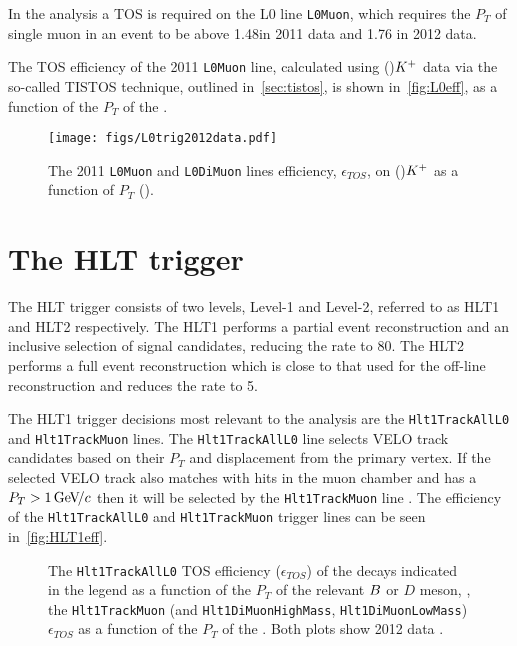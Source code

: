
In the \Lbpi analysis a TOS is required on the L0 line \texttt{L0Muon}, which requires the $P_{T}$  of single muon in an event to be above 1.48\gevc in 2011 data \cite{2011trig} and 1.76 \gevc in 2012 data.

The TOS efficiency of the 2011 \texttt{L0Muon} line, calculated using \Bu\to\jpsi(\mup\mun)${K}^{+}$ data via the so-called TISTOS technique, outlined in~\autoref{sec:tistos}, is shown in~\autoref{fig:L0eff}, as a function of the $P_{T}$ of the \jpsi.
\begin{figure}
  \centering
  \texttt{[image: figs/L0trig2012data.pdf]}%
  \caption{The 2011 \texttt{L0Muon} and \texttt{L0DiMuon} lines efficiency, $\epsilon_{TOS}$, on \Bu\to\jpsi(\mup\mun)${K}^{+}$ as a function of $P_{T}$ (\jpsi)\cite{LHCbperf}.
  }
  \label{fig:L0eff}
\end{figure}




\section{The HLT trigger}
\label{sec:hlttrig}
The HLT trigger consists of two levels, Level-1 and Level-2, referred to as HLT1 and HLT2 respectively. The HLT1 performs a partial event reconstruction and an inclusive selection of signal candidates, reducing the rate to 80\khz. The HLT2 performs a full event reconstruction which is close to that used for the off-line reconstruction and reduces the rate to 5\khz.

The HLT1 trigger decisions most relevant to the \Lbpi analysis are the \texttt{Hlt1TrackAllL0} and \texttt{Hlt1TrackMuon} lines. The \texttt{Hlt1TrackAllL0} line selects VELO track candidates based on their $P_{T}$ and displacement from the primary vertex. If the selected VELO track also matches with hits in the muon chamber and has a $P_{T}>1{\mathrm{\,Ge\kern -0.1em V\!/}c}$ then it will be selected by the \texttt{Hlt1TrackMuon} line \cite{trigperf}. The efficiency of the \texttt{Hlt1TrackAllL0} and \texttt{Hlt1TrackMuon} trigger lines can be seen in~\autoref{fig:HLT1eff}.%

\begin{figure}
  \centering
    \caption{The \texttt{Hlt1TrackAllL0} TOS efficiency ($\epsilon_{TOS}$) of the decays indicated in the legend as a function of the $P_{T}$ of the relevant ${B}$ or $D$ meson, \protect{}, the \texttt{Hlt1TrackMuon} (and \texttt{Hlt1DiMuonHighMass}, \texttt{Hlt1DiMuonLowMass}) $\epsilon_{TOS}$ as a function of the $P_{T}$ of the \jpsi \protect{}. Both plots show 2012 data \cite{trigperf}.
  }  \label{fig:HLT1eff}
\end{figure}

